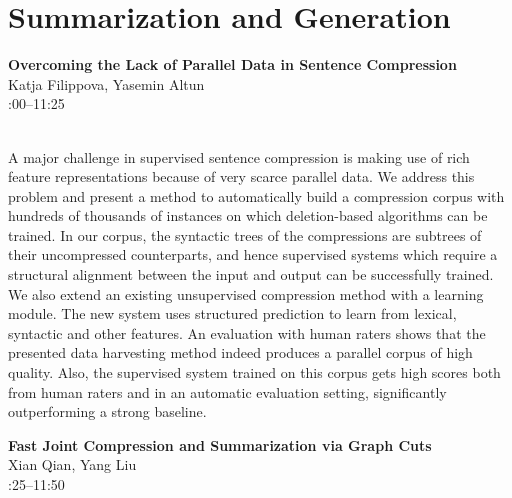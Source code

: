 \documentclass[twoside,makeidx]{book}
\renewcommand{\normalsize}{\fontsize{8}{9}\selectfont}
\renewcommand{\small}{\fontsize{7}{8}\selectfont}
\begin{document}
\section{Summarization and Generation}
\vspace{-1em}
\par\vspace{2em}\noindent%
\begin{minipage}{\linewidth}%
\begin{center}
\textbf{\normalsize Overcoming the Lack of Parallel Data in Sentence Compression}\\
\normalsize  Katja Filippova,  Yasemin Altun\\
{\small 11:00--11:25}\\
\end{center}
\end{minipage}\\[0.5em]
\nopagebreak%
\noindent%
{\small A major challenge in supervised sentence compression is making use   of rich feature representations because of very scarce parallel   data.  We address this problem and present a method to automatically   build a compression corpus with hundreds of thousands of instances   on which deletion-based algorithms can be trained. In our corpus,   the syntactic trees of the compressions are subtrees of their   uncompressed counterparts, and hence supervised systems which   require a structural alignment between the input and output can be   successfully trained. We also extend an existing unsupervised   compression method with a learning module. The new system uses   structured prediction to learn from lexical, syntactic and   other features.   An evaluation with human raters shows that the presented data   harvesting method indeed produces a parallel corpus of high quality.   Also, the supervised system trained on this corpus gets high scores   both from human raters and in an automatic evaluation setting,   significantly outperforming a strong baseline.}
\par\vspace{2em}\noindent%
\begin{minipage}{\linewidth}%
\begin{center}
\textbf{\normalsize Fast Joint Compression and Summarization via Graph Cuts}\\
\normalsize  Xian Qian,  Yang Liu\\
{\small 11:25--11:50}\\
\end{center}
\end{minipage}\\[0.5em]
\end{document}
